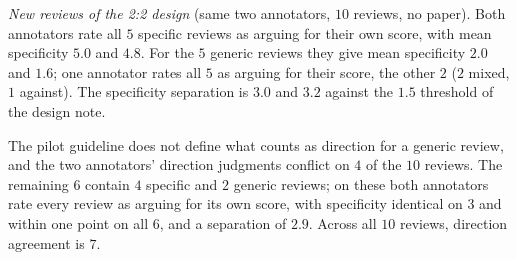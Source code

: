 {\emph{New reviews of the 2:2 design} (same two annotators, $10$ reviews, no
paper). Both annotators rate all $5$ specific reviews as arguing for their
own score, with mean specificity $5.0$ and $4.8$. For the $5$ generic
reviews they give mean specificity $2.0$ and $1.6$; one annotator rates all
$5$ as arguing for their score, the other $2$ ($2$ mixed, $1$ against). The
specificity separation is $3.0$ and $3.2$ against the $1.5$ threshold of the
design note.

The pilot guideline does not define what counts as direction for a generic
review, and the two annotators' direction judgments conflict on $4$ of the
$10$ reviews. The remaining $6$ contain $4$ specific and $2$ generic reviews;
on these both annotators rate every review as arguing for its own score, with
specificity identical on $3$ and within one point on all $6$, and a
separation of $2.9$. Across all $10$ reviews, direction agreement is $7$.}
